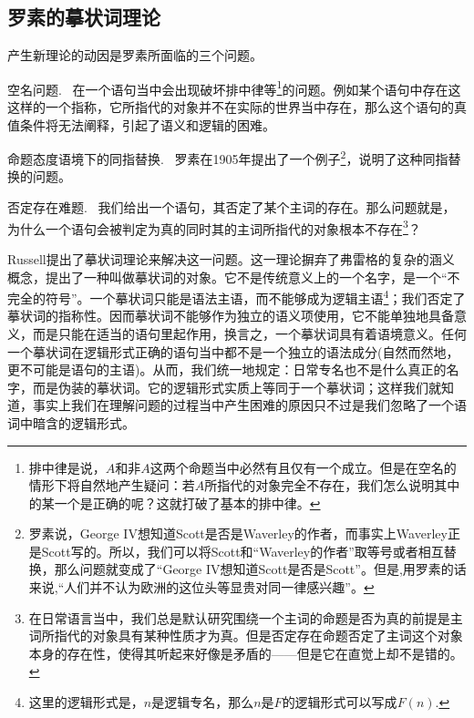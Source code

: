 \documentclass{article}
\begin{document}
\subsection{罗素的摹状词理论}
产生新理论的动因是罗素所面临的三个问题。

{\kaishu 空名问题.} \ 在一个语句当中会出现破坏排中律等\footnote{排中律是说，$A$和非$A$这两个命题当中必然有且仅有一个成立。但是在空名的情形下将自然地产生疑问：若$A$所指代的对象完全不存在，我们怎么说明其中的某一个是正确的呢？这就打破了基本的排中律。}的问题。例如某个语句中存在这这样的一个指称，它所指代的对象并不在实际的世界当中存在，那么这个语句的真值条件将无法阐释，引起了语义和逻辑的困难。

{\kaishu 命题态度语境下的同指替换.} \ 罗素在1905年提出了一个例子\footnote{罗素说，George IV想知道Scott是否是Waverley的作者，而事实上Waverley正是Scott写的。所以，我们可以将Scott和“Waverley的作者”取等号或者相互替换，那么问题就变成了“George IV想知道Scott是否是Scott”。但是,用罗素的话来说,“人们并不认为欧洲的这位头等显贵对同一律感兴趣”。}，说明了这种同指替换的问题。

{\kaishu 否定存在难题.} \ 我们给出一个语句，其否定了某个主词的存在。那么问题就是，为什么一个语句会被判定为真的同时其的主词所指代的对象根本不存在\footnote{在日常语言当中，我们总是默认研究围绕一个主词的命题是否为真的前提是主词所指代的对象具有某种性质才为真。但是否定存在命题否定了主词这个对象本身的存在性，使得其听起来好像是矛盾的——但是它在直觉上却不是错的。}？

Russell提出了{\heiti 摹状词理论}来解决这一问题。这一理论摒弃了弗雷格的复杂的涵义概念，提出了一种叫做{\heiti 摹状词}的对象。它不是传统意义上的一个名字，是一个“不完全的符号”。一个摹状词只能是语法主语，而不能够成为逻辑主语\footnote{这里的逻辑形式是，$n$是逻辑专名，那么$n$是$F$的逻辑形式可以写成$F(n).$}；我们否定了摹状词的指称性。因而摹状词不能够作为独立的语义项使用，它不能单独地具备意义，而是只能在适当的语句里起作用，换言之，一个摹状词具有着语境意义。任何一个摹状词在逻辑形式正确的语句当中都不是一个独立的语法成分(自然而然地，更不可能是语句的主语)。从而，我们统一地规定：日常专名也不是什么真正的名字，而是伪装的摹状词。它的逻辑形式实质上等同于一个摹状词；这样我们就知道，事实上我们在理解问题的过程当中产生困难的原因只不过是我们忽略了一个语词中暗含的逻辑形式。
\end{document}
